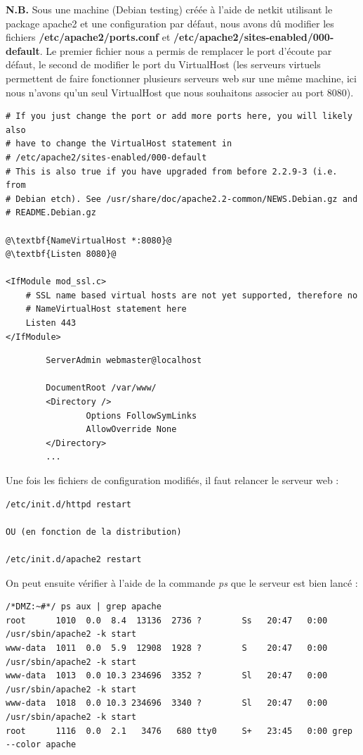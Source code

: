 \documentclass[frenchb, 11pt]{article}
\begin{document}
\noindent \textbf{N.B.} Sous une machine (Debian testing) créée à l'aide de netkit utilisant le package apache2 et une configuration par défaut, nous avons dû modifier les fichiers \textbf{/etc/apache2/ports.conf} et \textbf{/etc/apache2/sites-enabled/000-default}. Le premier fichier nous a permis de remplacer le port d'écoute par défaut, le second de modifier le port du VirtualHost (les serveurs virtuels permettent de faire fonctionner plusieurs serveurs web sur une même machine, ici nous n'avons qu'un seul VirtualHost que nous souhaitons associer au port 8080).

\begin{lstlisting}[caption=/etc/apache2/ports.conf, escapechar=@]
# If you just change the port or add more ports here, you will likely also
# have to change the VirtualHost statement in
# /etc/apache2/sites-enabled/000-default
# This is also true if you have upgraded from before 2.2.9-3 (i.e. from
# Debian etch). See /usr/share/doc/apache2.2-common/NEWS.Debian.gz and
# README.Debian.gz

@\textbf{NameVirtualHost *:8080}@
@\textbf{Listen 8080}@

<IfModule mod_ssl.c>
    # SSL name based virtual hosts are not yet supported, therefore no
    # NameVirtualHost statement here
    Listen 443
</IfModule>
\end{lstlisting}

\begin{lstlisting}[caption=/etc/apache2/sites-enabled/000-default, escapechar=\%]
%\textbf{<VirtualHost *:8080>}%
        ServerAdmin webmaster@localhost

        DocumentRoot /var/www/
        <Directory />
                Options FollowSymLinks
                AllowOverride None
        </Directory>
		...
\end{lstlisting}

\noindent Une fois les fichiers de configuration modifiés, il faut relancer le serveur web :
\begin{lstlisting}
/etc/init.d/httpd restart

OU (en fonction de la distribution)

/etc/init.d/apache2 restart
\end{lstlisting}
\hfill

\noindent On peut ensuite vérifier à l'aide de la commande \emph{ps} que le serveur est bien lancé :
\begin{lstlisting}
/*DMZ:~#*/ ps aux | grep apache
root      1010  0.0  8.4  13136  2736 ?        Ss   20:47   0:00 /usr/sbin/apache2 -k start
www-data  1011  0.0  5.9  12908  1928 ?        S    20:47   0:00 /usr/sbin/apache2 -k start
www-data  1013  0.0 10.3 234696  3352 ?        Sl   20:47   0:00 /usr/sbin/apache2 -k start
www-data  1018  0.0 10.3 234696  3340 ?        Sl   20:47   0:00 /usr/sbin/apache2 -k start
root      1116  0.0  2.1   3476   680 tty0     S+   23:45   0:00 grep --color apache
\end{lstlisting}
\hfill
\end{document}
